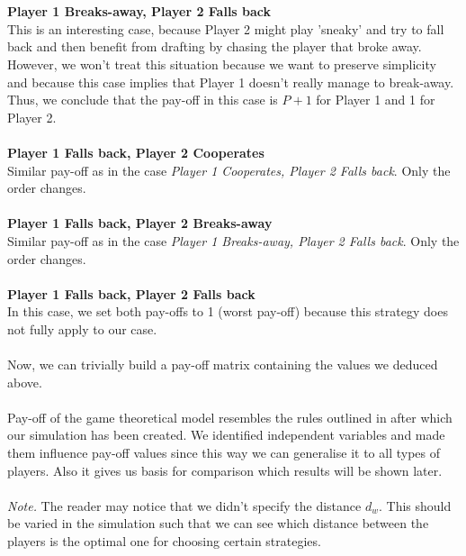 \documentclass[10pt, a4paper]{report}
\begin{document}
\\\\
\textbf{Player 1 Breaks-away, Player 2 Falls back}
\\
This is an interesting case, because Player 2 might play 'sneaky' and try to fall back and then benefit from drafting by chasing the player that broke away. However, we won't treat this situation because we want to preserve simplicity and because this case implies that Player 1 doesn't really manage to break-away. Thus, we conclude that the pay-off in this case is $P+1$ for Player 1 and 1 for Player 2.
\\\\
\textbf{Player 1 Falls back, Player 2 Cooperates}
\\
Similar pay-off as in the case \textit{Player 1 Cooperates, Player 2 Falls back}. Only the order changes.
\\\\
\textbf{Player 1 Falls back, Player 2 Breaks-away}
\\
Similar pay-off as in the case \textit{Player 1 Breaks-away, Player 2 Falls back}. Only the order changes.
\\\\
\textbf{Player 1 Falls back, Player 2 Falls back}
\\
In this case, we set both pay-offs to 1 (worst pay-off) because this strategy does not fully apply to our case.
\\\\
Now, we can trivially build a pay-off matrix containing the values we deduced above.\\\\
Pay-off of the game theoretical model resembles the rules outlined in \cite{AgentModel} after which our simulation has been created. We identified independent variables and made them influence pay-off values since this way we can generalise it to all types of players. Also it gives us basis for comparison which results will be shown later.\\\\
\textit{Note.} The reader may notice that we didn't specify the distance $d_w$. This should be varied in the simulation such that we can see which distance between the players is the optimal one for choosing certain strategies.
\end{document}
